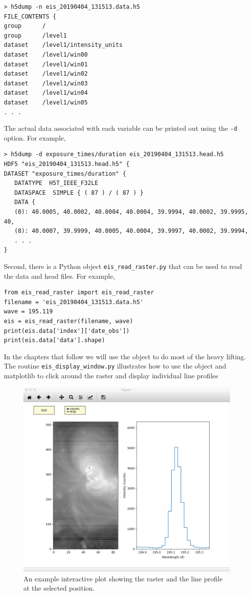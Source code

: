 \begin{lstlisting}
> h5dump -n eis_20190404_131513.data.h5
FILE_CONTENTS {
group      /
group      /level1
dataset    /level1/intensity_units
dataset    /level1/win00
dataset    /level1/win01
dataset    /level1/win02
dataset    /level1/win03
dataset    /level1/win04
dataset    /level1/win05
. . .
\end{lstlisting}
The actual data associated with each variable can be printed out using the \verb+-d+ option. For
example,
\begin{lstlisting}
> h5dump -d exposure_times/duration eis_20190404_131513.head.h5
HDF5 "eis_20190404_131513.head.h5" {
DATASET "exposure_times/duration" {
   DATATYPE  H5T_IEEE_F32LE
   DATASPACE  SIMPLE { ( 87 ) / ( 87 ) }
   DATA {
   (0): 40.0005, 40.0002, 40.0004, 40.0004, 39.9994, 40.0002, 39.9995, 40,
   (8): 40.0007, 39.9999, 40.0005, 40.0004, 39.9997, 40.0002, 39.9994,
   . . .
}
\end{lstlisting}
Second, there is a Python object \verb+eis_read_raster.py+ that can be used to read the data and head
files. For example,
\begin{lstlisting}
from eis_read_raster import eis_read_raster
filename = 'eis_20190404_131513.data.h5'
wave = 195.119
eis = eis_read_raster(filename, wave)
print(eis.data['index']['date_obs'])
print(eis.data['data'].shape)
\end{lstlisting}
In the chapters that follow we will use the object to do most of the heavy lifting. The routine
\verb+eis_display_window.py+ illustrates how to use the object and matplotlib to click around the
raster and display individual line profiles

\begin{figure}[t]
  \centerline{\includegraphics[clip,width=\linewidth]{figures/eis_display_window.pdf}}
  \caption{An example interactive plot showing the raster and the line profile at the selected
    position.}
  \label{fig:matplotlib}
\end{figure}
